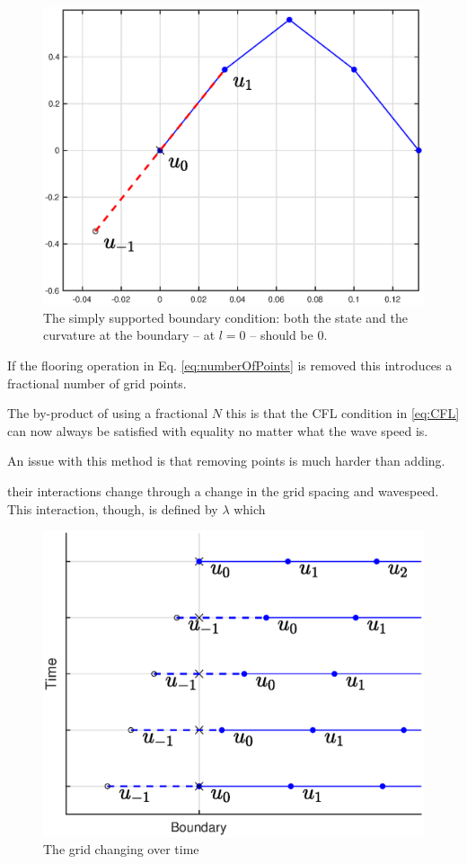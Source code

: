 \documentclass[dvipsnames, preprint]{JASA}
\begin{document}
\begin{figure}
\includegraphics[width=\reprintcolumnwidth]{simplySupportedBoundary}
\caption{\label{fig:simplySupportedBound}{The simply supported boundary condition: both the state and the curvature at the boundary -- at $l=0$ -- should be $0$.}}
\end{figure} 

If the flooring operation in Eq. \eqref{eq:numberOfPoints} is removed this introduces a fractional number of grid points.


The by-product of using a fractional $N$ this is that the CFL condition in \eqref{eq:CFL} can now always be satisfied with equality no matter what the wave speed is.

An issue with this method is that removing points is much harder than adding.

their interactions change through a change in the grid spacing and wavespeed. This interaction, though, is defined by $\lambda$ which 

\begin{figure}
\includegraphics[width=\reprintcolumnwidth]{boundaryGrid}
\caption{\label{fig:fullGrid}{The grid changing over time}}
\end{figure} 
\end{document}
